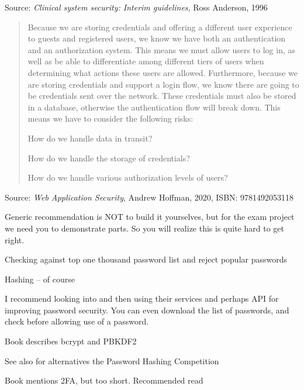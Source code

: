 \documentclass[Screen16to9,17pt]{foils}
\begin{document}



Source:
\emph{Clinical system security: Interim guidelines}, Ross Anderson, 1996



\begin{quote}
Because we are storing credentials and offering a different user experience to guests
and registered users, we know we have both an authentication and an authorization
system. This means we must allow users to log in, as well as be able to differentiate
among different tiers of users when determining what actions these users are allowed.
Furthermore, because we are storing credentials and support a login flow, we know
there are going to be credentials sent over the network. These credentials must also be
stored in a database, otherwise the authentication flow will break down.
This means we have to consider the following risks:
\begin{list2}
\item How do we handle data in transit?
\item How do we handle the storage of credentials?
\item How do we handle various authorization levels of users?
\end{list2}
\end{quote}
Source: \emph{Web Application Security}, Andrew Hoffman, 2020, ISBN: 9781492053118

Generic recommendation is NOT to build it yourselves, but for the exam project we need you to demonstrate parts. So you will realize this is quite hard to get right.





\begin{list2}
\item Checking against top one thousand password list and reject popular passwords
\item Hashing -- of course
\item I recommend looking into  and then using their services and perhaps API for improving password security. You can even download the list of passwords, and check before allowing use of a password.\\
\item Book describes bcrypt  and PBKDF2 

\item See also for alternatives the Password Hashing Competition\\
\item Book mentions 2FA, but too short. Recommended read 
\end{list2}
\end{document}
